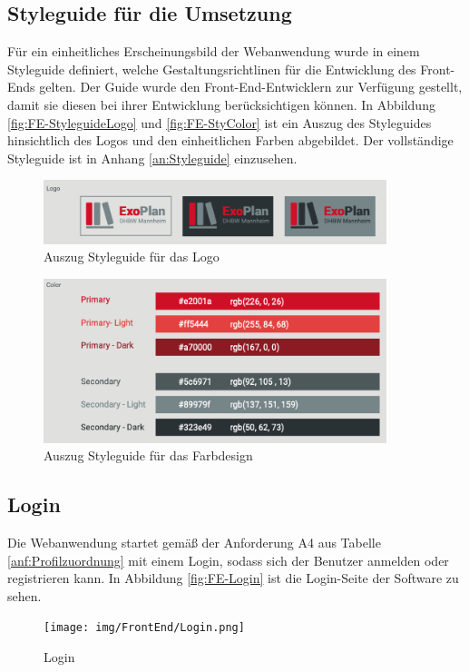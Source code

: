 \subsection{Styleguide für die Umsetzung}
Für ein einheitliches Erscheinungsbild der Webanwendung wurde in einem Styleguide definiert, welche Gestaltungsrichtlinen für die Entwicklung des Front-Ends gelten. 
Der Guide wurde den Front-End-Entwicklern zur Verfügung gestellt, damit 
sie diesen bei ihrer Entwicklung berücksichtigen können. 
In Abbildung \vref{fig:FE-StyleguideLogo} und \vref{fig:FE-StyColor} ist ein Auszug des Styleguides hinsichtlich des Logos und den einheitlichen Farben abgebildet.
Der vollständige Styleguide ist in Anhang \vref{an:Styleguide} einzusehen.
\begin{figure}[H]
	\centering 
	\includegraphics[width=10cm]{img/FrontEnd/StyLogo.png}
	\caption[Auszug Styleguide für das Logo]{\label{fig:FE-StyleguideLogo}Auszug Styleguide für das Logo}
\end{figure}

\begin{figure}[H]
	\centering 
	\includegraphics[width=10cm]{img/FrontEnd/StyColor.png}
	\caption[Auszug Styleguide für das Farbdesign]{\label{fig:FE-StyColor}Auszug Styleguide für das Farbdesign}
\end{figure}

\newpage
\subsection{Login}
Die Webanwendung startet gemäß der Anforderung A4 aus Tabelle \ref{anf:Profilzuordnung} mit einem Login, sodass sich der Benutzer anmelden oder registrieren kann. 
In Abbildung \vref{fig:FE-Login} ist die Login-Seite der Software zu sehen.
\begin{figure}[H]
	\centering 
	\texttt{[image: img/FrontEnd/Login.png]}
	\caption[Login]{\label{fig:FE-Login}Login}
\end{figure}

